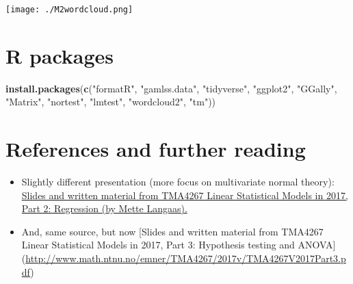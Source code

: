 \documentclass[
]{article}
\newenvironment{Shaded}{\begin{snugshade}}{\end{snugshade}}
\newcommand{\FunctionTok}[1]{\textcolor[rgb]{0.13,0.29,0.53}{\textbf{#1}}}
\newcommand{\NormalTok}[1]{#1}
\newcommand{\StringTok}[1]{\textcolor[rgb]{0.31,0.60,0.02}{#1}}
\providecommand{\tightlist}{%
  \setlength{\itemsep}{0pt}\setlength{\parskip}{0pt}}
\begin{document}
\texttt{[image: ./M2wordcloud.png]}

\hypertarget{r-packages}{%
\section{R packages}\label{r-packages}}

\begin{Shaded}
\begin{Highlighting}[]
\FunctionTok{install.packages}\NormalTok{(}\FunctionTok{c}\NormalTok{(}\StringTok{"formatR"}\NormalTok{, }\StringTok{"gamlss.data"}\NormalTok{, }\StringTok{"tidyverse"}\NormalTok{, }\StringTok{"ggplot2"}\NormalTok{,}
    \StringTok{"GGally"}\NormalTok{, }\StringTok{"Matrix"}\NormalTok{, }\StringTok{"nortest"}\NormalTok{, }\StringTok{"lmtest"}\NormalTok{, }\StringTok{"wordcloud2"}\NormalTok{, }\StringTok{"tm"}\NormalTok{))}
\end{Highlighting}
\end{Shaded}

\hypertarget{references-and-further-reading}{%
\section{References and further
reading}\label{references-and-further-reading}}

\begin{itemize}
\tightlist
\item
  Slightly different presentation (more focus on multivariate normal
  theory):
  \href{https://www.math.ntnu.no/emner/TMA4267/2017v/TMA4267V2017Part2.pdf}{Slides
  and written material from TMA4267 Linear Statistical Models in 2017,
  Part 2: Regression (by Mette Langaas).}
\item
  And, same source, but now {[}Slides and written material from TMA4267
  Linear Statistical Models in 2017, Part 3: Hypothesis testing and
  ANOVA{]}
  (\url{http://www.math.ntnu.no/emner/TMA4267/2017v/TMA4267V2017Part3.pdf})
\end{itemize}
\end{document}
